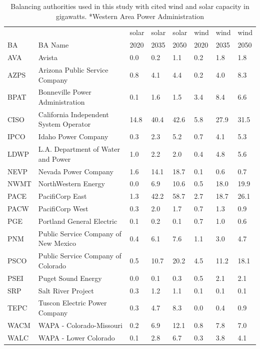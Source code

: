 \documentclass{agujournal2019}
\begin{document}
\begin{table}[ht]
\begin{tabular}{llllllll}
     &                                        & solar & solar & solar & wind & wind & wind \\
BA   & BA Name                                & 2020  & 2035  & 2050  & 2020 & 2035 & 2050 \\
\hline
AVA  & Avista                                 &   0.0 & 0.2 & 1.1 & 0.2 & 1.8 & 1.8 \\ 
AZPS & Arizona Public Service Company         &   0.8 & 4.1 & 4.4 & 0.2 & 4.0 & 8.3 \\ 
BPAT & Bonneville Power Administration        &   0.1 & 1.6 & 1.5 & 3.4 & 8.4 & 6.6 \\ 
CISO & California Independent System Operator &   14.8 & 40.4 & 42.6 & 5.8 & 27.9 & 31.5 \\ 
IPCO & Idaho Power Company                    &   0.3 & 2.3 & 5.2 & 0.7 & 4.1 & 5.3 \\ 
LDWP & L.A. Department of Water and Power     &   1.0 & 2.2 & 2.0 & 0.4 & 4.8 & 5.6 \\ 
NEVP & Nevada Power Company                   &   1.6 & 14.1 & 18.7 & 0.1 & 0.6 & 0.7 \\ 
NWMT & NorthWestern Energy                    &   0.0 & 6.9 & 10.6 & 0.5 & 18.0 & 19.9 \\ 
PACE & PacifiCorp East                        &   1.3 & 42.2 & 58.7 & 2.7 & 18.7 & 26.1 \\ 
PACW & PacifiCorp West                        &   0.3 & 2.0 & 1.7 & 0.7 & 1.3 & 0.9 \\ 
PGE  & Portland General Electric              &   0.1 & 0.2 & 0.1 & 0.7 & 1.0 & 0.6 \\ 
PNM  & Public Service Company of New Mexico   &   0.4 & 6.1 & 7.6 & 1.1 & 3.0 & 4.7 \\ 
PSCO & Public Service Company of Colorado     &   0.5 & 10.7 & 20.2 & 4.5 & 11.2 & 18.1 \\ 
PSEI & Puget Sound Energy                     &   0.0 & 0.1 & 0.3 & 0.5 & 2.1 & 2.1 \\ 
SRP  & Salt River Project                     &   0.3 & 1.2 & 1.1 & 0.1 & 0.1 & 0.1 \\ 
TEPC & Tuscon Electric Power Company          &   0.3 & 4.7 & 8.3 & 0.0 & 0.4 & 0.9 \\ 
WACM & WAPA - Colorado-Missouri               &   0.2 & 6.9 & 12.1 & 0.8 & 7.8 & 7.0 \\ 
WALC & WAPA - Lower Colorado                  &   0.1 & 2.8 & 6.7 & 0.3 & 3.8 & 4.1 \\ 
\hline
\end{tabular}
\caption{Balancing authorities used in this study with cited wind and solar capacity in gigawatts. *Western Area Power Administration}
\label{tab:bas-bau}
\end{table}
\end{document}
